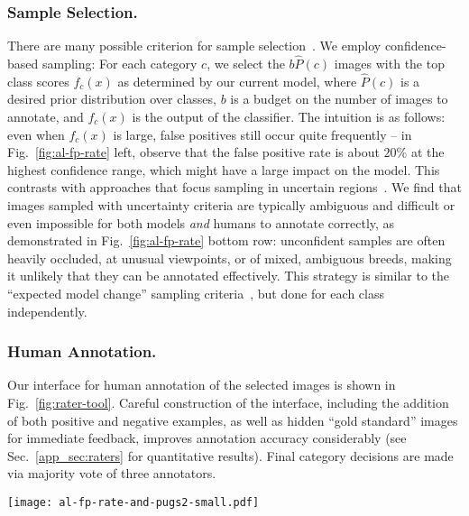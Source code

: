\documentclass[runningheads]{llncs}
\begin{document}
\subsubsection{Sample Selection.}
There are many possible criterion for sample selection~\cite{al-survey}.
We employ confidence-based sampling: For each category $c$, we select the $b\hat{P}(c)$ images with the top class scores $f_c(x)$ as determined by our current model, where $\hat{P}(c)$ is a desired prior distribution over classes, $b$ is a budget on the number of images to annotate, and $f_c(x)$ is the output of the classifier.
The intuition is as follows: even when $f_c(x)$ is large, false positives still occur quite frequently -- in Fig.~\ref{fig:al-fp-rate} left, observe that the false positive rate is about $20\%$ at the highest confidence range, which might have a large impact on the model.
This contrasts with approaches that focus sampling in uncertain regions~\cite{lewis1994heterogeneous,balcan2007margin,mozafari2014scaling,erkan2010semi}.
We find that images sampled with uncertainty criteria are typically ambiguous and difficult or even impossible for both models \emph{and} humans to annotate correctly, as demonstrated in Fig.~\ref{fig:al-fp-rate} bottom row: unconfident samples are often heavily occluded, at unusual viewpoints, or of mixed, ambiguous breeds, making it unlikely that they can be annotated effectively.
This strategy is similar to the ``expected model change'' sampling criteria~\cite{settles2008multiple}, but done for each class independently.


\subsubsection{Human Annotation.}
\label{sec:raters}
Our interface for human annotation of the selected images is shown in Fig.~\ref{fig:rater-tool}.
Careful construction of the interface, including the addition of both positive and negative examples, as well as hidden ``gold standard'' images for immediate feedback, improves annotation accuracy considerably (see Sec.~\ref{app_sec:raters} for quantitative results).
Final category decisions are made via majority vote of three annotators.

\begin{figure*}[t]
\centering
\texttt{[image: al-fp-rate-and-pugs2-small.pdf]}
\caption{
  \textbf{Left:} Classifier confidence versus false positive rate on 100,000 randomly sampled from Flickr images (YFCC100M~\cite{thomee2015yfcc100m}) with dog detections.
  Even the most confident images have a 20\% false positive rate.
\textbf{Right:} Samples from Flickr.  Rectangles below images denote correct ({\color[rgb]{0,0.8,0} green}), incorrect ({\color{red} red}), or ambiguous ({\color[rgb]{0.8,0.8,0.0}yellow}).
\textbf{Top row:} Samples with high confidence for class ``Pug'' from YFCC100M.
\textbf{Bottom row:} Samples with low confidence score for class ``Pug''. 
}
\label{fig:al-fp-rate}
\end{figure*}
\end{document}
